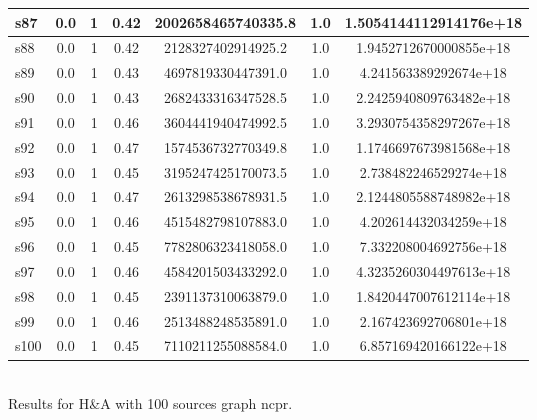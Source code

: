 \documentclass{article}
\begin{document}
\begin{tabular}{|l|c|c|c|c|c|c|}
\hline
s87 &0.0 & 1 & 0.42 & 2002658465740335.8 & 1.0 & 1.5054144112914176e+18\\
\hline
s88 &0.0 & 1 & 0.42 & 2128327402914925.2 & 1.0 & 1.9452712670000855e+18\\
\hline
s89 &0.0 & 1 & 0.43 & 4697819330447391.0 & 1.0 & 4.241563389292674e+18\\
\hline
s90 &0.0 & 1 & 0.43 & 2682433316347528.5 & 1.0 & 2.2425940809763482e+18\\
\hline
s91 &0.0 & 1 & 0.46 & 3604441940474992.5 & 1.0 & 3.2930754358297267e+18\\
\hline
s92 &0.0 & 1 & 0.47 & 1574536732770349.8 & 1.0 & 1.1746697673981568e+18\\
\hline
s93 &0.0 & 1 & 0.45 & 3195247425170073.5 & 1.0 & 2.738482246529274e+18\\
\hline
s94 &0.0 & 1 & 0.47 & 2613298538678931.5 & 1.0 & 2.1244805588748982e+18\\
\hline
s95 &0.0 & 1 & 0.46 & 4515482798107883.0 & 1.0 & 4.202614432034259e+18\\
\hline
s96 &0.0 & 1 & 0.45 & 7782806323418058.0 & 1.0 & 7.332208004692756e+18\\
\hline
s97 &0.0 & 1 & 0.46 & 4584201503433292.0 & 1.0 & 4.3235260304497613e+18\\
\hline
s98 &0.0 & 1 & 0.45 & 2391137310063879.0 & 1.0 & 1.8420447007612114e+18\\
\hline
s99 &0.0 & 1 & 0.46 & 2513488248535891.0 & 1.0 & 2.167423692706801e+18\\
\hline
s100 &0.0 & 1 & 0.45 & 7110211255088584.0 & 1.0 & 6.857169420166122e+18\\
\hline
\end{tabular}\\

\noindent Results for H\&A with 100 sources graph ncpr.
\end{document}
